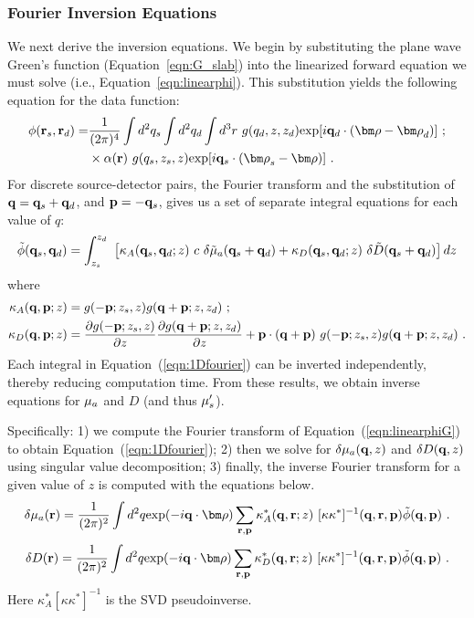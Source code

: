 \subsubsection{Fourier Inversion Equations}
We next derive the inversion equations. We begin by substituting the plane wave Green's function (Equation~\ref{eqn:G_slab}) into the linearized forward equation we must solve (i.e., Equation~\ref{eqn:linearphi}). This substitution yields the following equation for the data function:
%
\begin{eqnarray}
\label{eqn:linearphiG}
\phi(\mbf{r}_s,\mbf{r}_d) = & \frac{1}{(2\pi)^4} \int d^2q_s \int d^2q_d \int d^3r \ g(q_d,z,z_d) {\rm exp}[i\mbf{q}_d \cdot ({\bm \rho} - {\bm \rho}_d)] \ ; \nonumber \\
 & \times \alpha(\mbf{r}) \ g(q_s,z_s,z) {\rm exp}[i\mbf{q}_s \cdot ({\bm \rho}_s - {\bm \rho})] \ .
\end{eqnarray}
%
For discrete source-detector pairs, the Fourier transform and the substitution of $\mathbf{q} = \mathbf{q}_s + \mathbf{q}_d$, and $\mathbf{p}=-\mathbf{q}_s$, gives us a set of separate integral equations for each value of $q$:
%
\begin{equation}
\label{eqn:1Dfourier}
\tilde{\phi}(\mathbf{q}_s, \mathbf{q}_d) = \int_{z_s}^{z_d} \ \left[
\kappa_A(\mathbf{q}_s,\mathbf{q}_d;z)\ c \ \delta \tilde{\mu}_a(\mathbf{q}_s+\mathbf{q}_d) +
\kappa_D(\mathbf{q}_s,\mathbf{q}_d;z) \ \delta \tilde{D}(\mathbf{q}_s+\mathbf{q}_d) \right] dz
\end{equation}
%
where
\begin{align}
\label{kappaA}
\kappa_A(\mbf{q},\mbf{p};z) & = g(-\mbf{p};z_s,z) g(\mbf{q}+\mbf{p};z,z_d) \ ; \\
\label{kappaD}
\kappa_D(\mbf{q},\mbf{p};z) & = \frac{\partial g(-\mbf{p};z_s,z)}{\partial z}\frac{\partial g(\mbf{q}+\mbf{p};z,z_d)}{\partial z}+\mbf{p} \cdot (\mbf{q}+\mbf{p}) \ g(-\mbf{p};z_s,z) g(\mbf{q}+\mbf{p};z,z_d) \ .
\end{align}
%
Each integral in Equation~(\ref{eqn:1Dfourier}) can be inverted independently, thereby reducing computation time. From these results, we obtain inverse equations for $\mu_a$ and $D$ (and thus $\mu_s^{\prime}$).

Specifically:  1) we compute the Fourier transform of Equation~(\ref{eqn:linearphiG}) to obtain Equation~(\ref{eqn:1Dfourier}); 2) then we solve for $\delta \mu_a(\mathbf{q},z)$ and $\delta D(\mathbf{q},z)$ using singular value decomposition; 3) finally, the inverse Fourier transform for a given value of $z$ is computed with the equations below.
\begin{equation}
\delta \mu_a(\mbf{r}) = \frac{1}{(2\pi)^2} \int d^2q {\rm exp}(-i \mbf{q} \cdot {\bm \rho}) \sum_{\mbf{r},\mbf{p}} \kappa_A^*(\mbf{q},\mbf{r};z) \ [\kappa\kappa^*]^{-1}(\mbf{q},\mbf{r},\mbf{p}) \tilde{\phi}(\mbf{q},\mbf{p}) \ .
\end{equation}
\begin{equation}
\delta D(\mbf{r}) = \frac{1}{(2\pi)^2} \int d^2q {\rm exp}(-i \mbf{q} \cdot {\bm \rho}) \sum_{\mbf{r},\mbf{p}} \kappa_D^*(\mbf{q},\mbf{r};z) \ [\kappa\kappa^*]^{-1}(\mbf{q},\mbf{r},\mbf{p}) \tilde{\phi}(\mbf{q},\mbf{p}) \ .
\end{equation}
Here $\kappa_A^* [\kappa\kappa^*]^{-1}$ is the SVD pseudoinverse.

